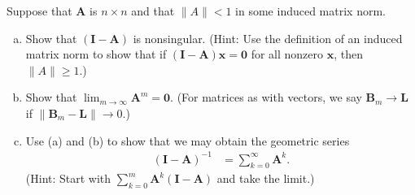 \documentclass[11pt]{article}
\renewcommand{\vec}[1]{\mathbf{#1}}
\newenvironment{problem}[2][Question]{\begin{trivlist}
\item[\hskip \labelsep {\bfseries #1}\hskip \labelsep {\bfseries #2.}]}{\end{trivlist}}
\theoremstyle{definition}
\begin{document}
\begin{problem}{2.7.11}
Suppose that $\vec{A}$ is $n \times n$ and that $\|A\| < 1$ in some induced matrix norm.

\begin{enumerate}[(a)]
    \item Show that $(\vec{I} - \vec{A})$ is nonsingular. (Hint: Use the definition of an induced matrix norm to show that if $(\vec{I} - \vec{A})\vec{x} = \vec{0}$ for all nonzero $\vec{x}$, then $\|A\| \geq 1$.)

    \item Show that $\lim_{m \rightarrow \infty} \vec{A}^m = \vec{0}$. (For matrices as with vectors, we say $\vec{B}_m \rightarrow \vec{L}$ if $\|\vec{B}_m - \vec{L}\| \rightarrow 0$.)

    \item Use (a) and (b) to show that we may obtain the geometric series
    \begin{align}
        (\vec{I} - \vec{A})^{-1} &= \sum_{k = 0}^{\infty} \vec{A}^k. \tag{2.7.15}
    \end{align}
    (Hint: Start with $\sum_{k = 0}^m \vec{A}^k(\vec{I} - \vec{A})$ and take the limit.)
\end{enumerate}
\end{problem}
\end{document}
